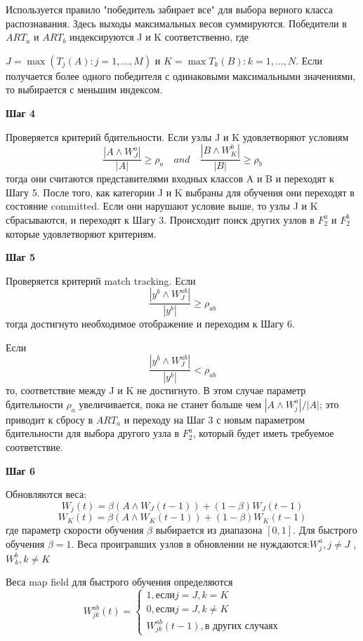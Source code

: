 Используется правило "победитель забирает все" для выбора верного класса распознавания. Здесь выходы максимальных весов суммируются. Победители в $ART_a$ и $ART_b$ индексируются J и K соответственно, где 

$J = \max(T_j(A):j=1, \ldots, M)$ и $K = \max{T_k(B):k=1, \ldots, N}$. Если получается более одного победителя с одинаковыми максимальными значениями, то выбирается с меньшим индексом.

\textbf{Шаг 4}

Проверяется критерий бдительности. Если узлы J и K удовлетворяют условиям
$$
	\frac{|A \wedge W_J^a|}{|A|} \geq \rho_a \quad and \quad \frac{|B \wedge W_K^b|}{|B|} \geq \rho_b
$$
тогда они считаются представителями входных классов A и B и переходят к Шагу 5.  После того, как категории J и K выбраны для обучения они переходят в состояние committed. Если они нарушают условие выше, то узлы J и K сбрасываются, и переходят к Шагу 3. Происходит поиск других узлов в $F_2^a$ и $F_2^b$ которые удовлетворяют критериям.

\textbf{Шаг 5}
	
Проверяется критерий match tracking. Если
$$ 
	\frac{|y^b \wedge W_J^{ab}|}{|y^b|} \geq \rho_{ab}
$$
тогда достигнуто необходимое отображение и переходим к Шагу 6.

Если
$$ 
	\frac{|y^b \wedge W_J^{ab}|}{|y^b|} < \rho_{ab}
$$
то, соответствие между J и K не достигнуто. В этом случае параметр бдительности $\rho_a$ увеличивается, пока не станет больше чем $|A \wedge W_j^a| / |A|$; это приводит к сбросу в $ART_a$ и переходу на Шаг 3 с новым параметром бдительности для выбора другого узла в $F_2^a$, который будет иметь требуемое соответствие.

\textbf{Шаг 6}

Обновляются веса:
$$ 
	W_j(t) = \beta(A \wedge W_J(t-1)) + (1-\beta) W_J (t-1)
$$
$$ 
	W_K(t) = \beta(A \wedge W_K(t-1)) + (1-\beta) W_K (t-1)
$$
где параметр скорости обучения $\beta$ выбирается из диапазона $[0,1]$. Для быстрого обучения $\beta = 1$. Веса проигравших узлов в обновлении не нуждаются:$W_j^a, j\neq J$ , $W_k^b, k\neq K$

Веса map field для быстрого обучения определяются
\begin{displaymath}
	W_{jk}^{ab} (t) = \left\{
	\begin{array}{l}
		1, \mbox{если} j=J, k=K \\
		0, \mbox{если} j=J, k\neq K \\
		W_{jk}^{ab}(t-1), \mbox{в других случаях}
	\end{array}
\right .
\end{displaymath}

